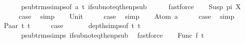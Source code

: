 \begin{isabellebody}
\ \ \ \ \ \ psub{\isacharunderscore}{\kern0pt}trms{\isachardot}{\kern0pt}simps{\isacharparenleft}{\kern0pt}{}{\isacharparenright}{\kern0pt}{\isacharbrackleft}{\kern0pt}of\ a\ t{\isacharbrackright}{\kern0pt}\ if{\isacharunderscore}{\kern0pt}sub{\isacharunderscore}{\kern0pt}not{\isacharunderscore}{\kern0pt}eq{\isacharunderscore}{\kern0pt}then{\isacharunderscore}{\kern0pt}psub\isanewline
\ \ \ \ \isamarkupfalse%
\ fastforce\isanewline
{}\isamarkupfalse%
\isanewline
\ \ \isamarkupfalse%
\ {\isacharparenleft}{\kern0pt}Susp\ pi\ X{\isacharparenright}{\kern0pt}\isanewline
\ \ \isamarkupfalse%
\ \isamarkupfalse%
\ {\isacharquery}{\kern0pt}case\ \isamarkupfalse%
\ simp\isanewline
{}\isamarkupfalse%
\isanewline
\ \ \isamarkupfalse%
\ Unit\isanewline
\ \ \isamarkupfalse%
\ \isamarkupfalse%
\ {\isacharquery}{\kern0pt}case\ \isamarkupfalse%
\ simp\isanewline
{}\isamarkupfalse%
\isanewline
\ \ \isamarkupfalse%
\ {\isacharparenleft}{\kern0pt}Atom\ a{\isacharparenright}{\kern0pt}\isanewline
\ \ \isamarkupfalse%
\ \isamarkupfalse%
\ {\isacharquery}{\kern0pt}case\ \isamarkupfalse%
\ simp\isanewline
{}\isamarkupfalse%
\isanewline
\ \ \isamarkupfalse%
\ {\isacharparenleft}{\kern0pt}Paar\ t{}{\isacharprime}{\kern0pt}\ t{}{\isacharprime}{\kern0pt}{\isacharparenright}{\kern0pt}\isanewline
\ \ \isamarkupfalse%
\ \isamarkupfalse%
\ {\isacharquery}{\kern0pt}case\ \isanewline
\ \ \ \ \isamarkupfalse%
\ depth{\isachardot}{\kern0pt}simps{\isacharparenleft}{\kern0pt}{}{\isacharparenright}{\kern0pt}{\isacharbrackleft}{\kern0pt}of\ t{}{\isacharprime}{\kern0pt}\ t{}{\isacharprime}{\kern0pt}{\isacharbrackright}{\kern0pt}\ \isanewline
\ \ \ \ \ \ psub{\isacharunderscore}{\kern0pt}trms{\isachardot}{\kern0pt}simps{\isacharparenleft}{\kern0pt}{}{\isacharparenright}{\kern0pt}\ if{\isacharunderscore}{\kern0pt}sub{\isacharunderscore}{\kern0pt}not{\isacharunderscore}{\kern0pt}eq{\isacharunderscore}{\kern0pt}then{\isacharunderscore}{\kern0pt}psub\ \isamarkupfalse%
\ fastforce\isanewline
{}\isamarkupfalse%
\isanewline
\ \ \isamarkupfalse%
\ {\isacharparenleft}{\kern0pt}Func\ f\ t{}{\isacharprime}{\kern0pt}{\isacharparenright}{\kern0pt}\isanewline

\end{isabellebody}

